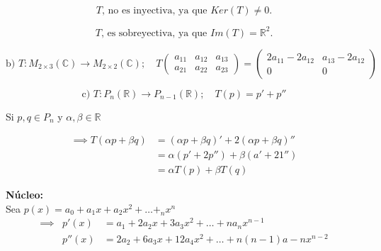 \documentclass{article}
\begin{document}
\begin{enumerate}
			\begin{equation*}
				\boxed{\text{\(T\), no es inyectiva, ya que \(Ker(T)\neq 0\).}}
			\end{equation*}
			
			\begin{equation*}
				\boxed{\text{\(T\), es sobreyectiva, ya que \(Im (T)=\mathbb{R}^2\).}}
			\end{equation*}
			
			\begin{equation*}
				\text{b) } T:M_{2\times 3}(\mathbb{C})\to M_{2\times 2}(\mathbb{C}); \quad 
				T\begin{pmatrix}
					a_{11} & a_{12} & a_{13}  \\
					a_{21} & a_{22} & a_{23}
				\end{pmatrix} =
				\begin{pmatrix}
					2a_{11} - 2a_{12} & a_{13} - 2a_{12} \\
					0 				  & 0
				\end{pmatrix}
			\end{equation*}
			
			\begin{equation*}
				\text{c) } T:P_n(\mathbb{R}) \to P_{n-1}(\mathbb{R}); \quad T(p) = p' + p''
			\end{equation*}
			
			Si \(p,q \in P_n\) y \(\alpha ,\beta \in \mathbb{R}\)
			
			\begin{equation*}
				\begin{aligned}
					\implies T(\alpha p + \beta q) &= (\alpha p + \beta q)' + 2(\alpha p + \beta q)'' \\
												   &= \alpha(p'+2p'') +       \beta(a' + 21'')\\
												   &=\alpha T(p) + \beta T(q)
				\end{aligned}
			\end{equation*}
			
			\textbf{Núcleo:} \\
			Sea \(p(x)=a_0+a_1x+a_2x^2+\dots +_nx^{n}\)
			\begin{equation*}
				\begin{aligned}
					\implies &p'(x)  &= a_1+2a_2x+3a_3x^2+ \dots +na_{n}x^{n-1} \\
							 &p''(x) &= 2a_2+6a_3x+12a_4x^2+ \dots +n(n-1)a-{n}x^{n-2} \\
				\end{aligned}
			\end{equation*}
			

\end{enumerate}
\end{document}
